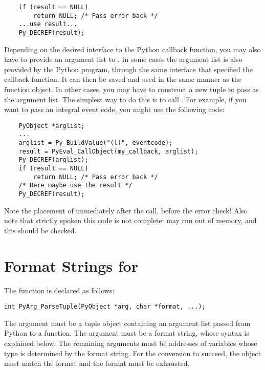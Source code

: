 \documentclass{manual}
\begin{document}
\begin{verbatim}
    if (result == NULL)
        return NULL; /* Pass error back */
    ...use result...
    Py_DECREF(result); 
\end{verbatim}

Depending on the desired interface to the Python callback function,
you may also have to provide an argument list to
.  In some cases the argument list is
also provided by the Python program, through the same interface that
specified the callback function.  It can then be saved and used in the
same manner as the function object.  In other cases, you may have to
construct a new tuple to pass as the argument list.  The simplest way
to do this is to call .  For example, if
you want to pass an integral event code, you might use the following
code:

\begin{verbatim}
    PyObject *arglist;
    ...
    arglist = Py_BuildValue("(l)", eventcode);
    result = PyEval_CallObject(my_callback, arglist);
    Py_DECREF(arglist);
    if (result == NULL)
        return NULL; /* Pass error back */
    /* Here maybe use the result */
    Py_DECREF(result);
\end{verbatim}

Note the placement of  immediately after the
call, before the error check!  Also note that strictly spoken this
code is not complete:  may run out of
memory, and this should be checked.


\section{Format Strings for }
\label{parseTuple}

The  function is declared as follows:

\begin{verbatim}
int PyArg_ParseTuple(PyObject *arg, char *format, ...);
\end{verbatim}

The  argument must be a tuple object containing an argument
list passed from Python to a \C{} function.  The  argument
must be a format string, whose syntax is explained below.  The
remaining arguments must be addresses of variables whose type is
determined by the format string.  For the conversion to succeed, the
 object must match the format and the format must be
exhausted.
\end{document}
